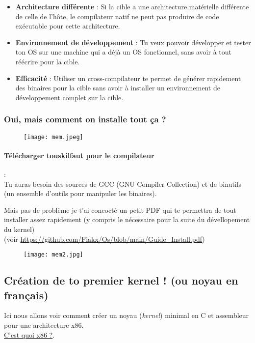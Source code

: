 \documentclass{article}
\begin{document}
\begin{itemize}
    \item \textbf{Architecture différente} : Si la cible a une architecture matérielle différente de celle de l'hôte, le compilateur natif ne peut pas produire de code exécutable pour cette architecture.
    
    \item \textbf{Environnement de développement} : Tu veux pouvoir développer et tester ton OS sur une machine qui a déjà un OS fonctionnel, sans avoir à tout réécrire pour la cible.
    
    \item \textbf{Efficacité} : Utiliser un cross-compilateur te permet de générer rapidement des binaires pour la cible sans avoir à installer un environnement de développement complet sur la cible.
\end{itemize}

\subsubsection*{Oui, mais comment on installe tout ça ?}

\begin{figure}[h!]
    \centering
    \texttt{[image: mem.jpeg]}
    \label{fig:logo1}
\end{figure}

\paragraph{Télécharger touskilfaut pour le compilateur}
:\\Tu auras besoin des sources de GCC (GNU Compiler Collection) et de binutils (un ensemble d'outils pour manipuler les binaires).

Mais pas de problème je t'ai concocté un petit PDF qui te permettra de tout installer assez rapidement (y compris le nécessaire pour la suite du dévellopement du kernel)\\ (voir \url{https://github.com/Fiakx/Os/blob/main/Guide_Install.pdf})

\begin{figure}[h!]
    \centering
    \texttt{[image: mem2.jpg]}
    \label{fig:logo2}
\end{figure}



\subsection*{Création de to premier kernel ! (ou noyau en français)}
Ici nous allons voir comment créer un noyau (\textit{kernel}) minimal en C et assembleur pour une architecture x86. \\ \hyperref[fig:x86]{C'est quoi x86 ?}.
\end{document}
